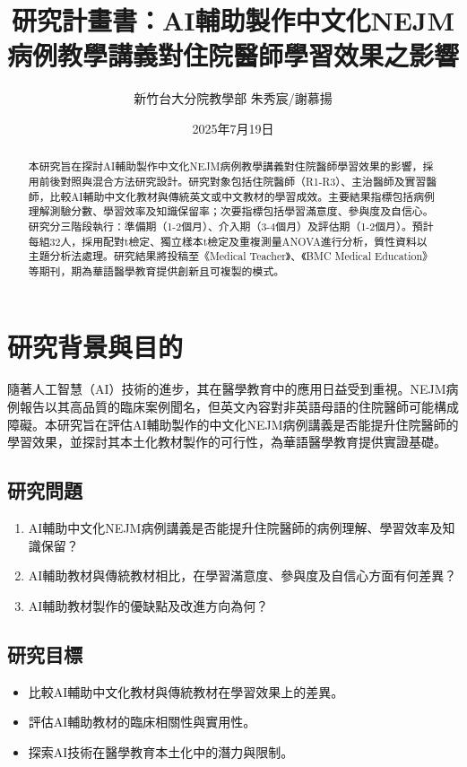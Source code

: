 \documentclass[12pt]{article}
\begin{document}
\title{研究計畫書：AI輔助製作中文化NEJM病例教學講義對住院醫師學習效果之影響}
\author{新竹台大分院教學部 朱秀宸/謝慕揚}
\date{2025年7月19日}
\maketitle

\begin{abstract}
本研究旨在探討AI輔助製作中文化NEJM病例教學講義對住院醫師學習效果的影響，採用前後對照與混合方法研究設計。研究對象包括住院醫師（R1-R3）、主治醫師及實習醫師，比較AI輔助中文化教材與傳統英文或中文教材的學習成效。主要結果指標包括病例理解測驗分數、學習效率及知識保留率；次要指標包括學習滿意度、參與度及自信心。研究分三階段執行：準備期（1-2個月）、介入期（3-4個月）及評估期（1-2個月）。預計每組32人，採用配對t檢定、獨立樣本t檢定及重複測量ANOVA進行分析，質性資料以主題分析法處理。研究結果將投稿至《Medical Teacher》、《BMC Medical Education》等期刊，期為華語醫學教育提供創新且可複製的模式。
\end{abstract}

\section{研究背景與目的}
隨著人工智慧（AI）技術的進步，其在醫學教育中的應用日益受到重視。NEJM病例報告以其高品質的臨床案例聞名，但英文內容對非英語母語的住院醫師可能構成障礙。本研究旨在評估AI輔助製作的中文化NEJM病例講義是否能提升住院醫師的學習效果，並探討其本土化教材製作的可行性，為華語醫學教育提供實證基礎。

\subsection{研究問題}
\begin{enumerate}
    \item AI輔助中文化NEJM病例講義是否能提升住院醫師的病例理解、學習效率及知識保留？
    \item AI輔助教材與傳統教材相比，在學習滿意度、參與度及自信心方面有何差異？
    \item AI輔助教材製作的優缺點及改進方向為何？
\end{enumerate}

\subsection{研究目標}
\begin{itemize}
    \item 比較AI輔助中文化教材與傳統教材在學習效果上的差異。
    \item 評估AI輔助教材的臨床相關性與實用性。
    \item 探索AI技術在醫學教育本土化中的潛力與限制。
\end{itemize}
\end{document}
